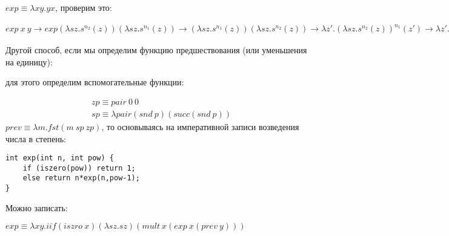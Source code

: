 \documentclass[a4paper,12pt]{article}
\begin{document}
\begin{Solution}

$exp \equiv \lambda x y . y x$, проверим это:

$exp ~x ~y \rightarrow exp \left(\lambda sz . s^{n_2}\left(z\right)\right)\left(\lambda sz . s^{n_1}\left(z\right)\right) \rightarrow \left(\lambda sz . s^{n_1}\left(z\right)\right)\left(\lambda sz . s^{n_2}\left(z\right)\right) \rightarrow \lambda z' . \left(\lambda sz . s^{n_2}\left(z\right)\right)^{n_1}\left(z'\right) \rightarrow \lambda z' . \left(\lambda z . {z'}^{n_2}\left(z\right)\right)^{n_1} \rightarrow \lambda z'z . \left({z'}^{n_2}\left(z\right)\right)^{n_1} \rightarrow \lambda z'z . {z'}^{{n_2}^{n_1}}\left(z\right)$

Другой способ, если мы определим функцию предшествования (или уменьшения на единицу):

для этого определим вспомогательные функции:

\[
	\begin{split}
		&zp \equiv pair ~0 ~0\\
		&sp \equiv \lambda pair \left( snd ~p\right) \left(succ \left(snd ~p\right)\right)
	\end{split}
\]
$prev \equiv \lambda m. fst \left(m ~sp ~zp\right)$, то основываясь на императивной записи возведения числа в степень:

\begin{lstlisting}
int exp(int n, int pow) {
	if (iszero(pow)) return 1;
	else return n*exp(n,pow-1);
}
\end{lstlisting}

Можно записать:

$exp \equiv \lambda xy. iif \left(iszro ~x\right) \left(\lambda sz . sz\right) \left(mult ~x \left(exp ~x \left(prev ~y\right)\right)\right) $

\end{Solution}
\end{document}
